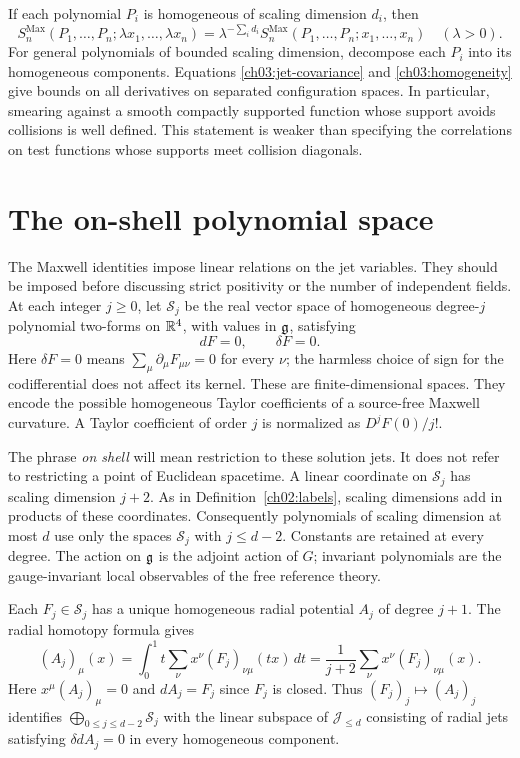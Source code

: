 If each polynomial $P_i$ is homogeneous of scaling dimension $d_i$, then
\begin{equation}\label{ch03:homogeneity}
 S_n^{\mathrm{Max}}(P_1,\ldots,P_n;\lambda x_1,\ldots,\lambda x_n)
 =\lambda^{-\sum_i d_i}
 S_n^{\mathrm{Max}}(P_1,\ldots,P_n;x_1,\ldots,x_n)
 \quad(\lambda>0).
\end{equation}
For general polynomials of bounded scaling dimension, decompose each $P_i$
into its homogeneous components. Equations \eqref{ch03:jet-covariance} and
\eqref{ch03:homogeneity} give bounds on all derivatives on separated
configuration spaces. In particular, smearing against a smooth compactly
supported function whose support avoids collisions is well defined.
This statement is weaker than specifying the correlations on test functions whose supports meet collision diagonals.

\section{The on-shell polynomial space}\label{ch03:shell}

The Maxwell identities impose linear relations on the jet variables.
They should be imposed before discussing strict positivity or the
number of independent fields. At each integer $j\ge0$, let
$\mathcal S_j$ be the real vector space of homogeneous degree-$j$
polynomial two-forms on $\mathbb R^4$, with values in $\mathfrak g$, satisfying
\[
 dF=0,\qquad \delta F=0.
\]
Here $\delta F=0$ means
$\sum_\mu\partial_\mu F_{\mu\nu}=0$ for every $\nu$; the harmless
choice of sign for the codifferential does not affect its kernel.
These are finite-dimensional spaces. They encode the possible homogeneous
Taylor coefficients of a source-free Maxwell curvature. A Taylor
coefficient of order $j$ is normalized as $D^jF(0)/j!$.

The phrase \emph{on shell} will mean restriction to these solution jets.
It does not refer to restricting a point of Euclidean spacetime.
A linear coordinate on $\mathcal S_j$ has scaling dimension $j+2$. As in Definition~\ref{ch02:labels},
scaling dimensions add in products of these coordinates.
Consequently polynomials of scaling dimension at most $d$ use only the spaces
$\mathcal S_j$ with $j\le d-2$. Constants are retained at every degree.
The action on $\mathfrak g$ is the adjoint action of $G$; invariant polynomials
are the gauge-invariant local observables of the free reference theory.

Each $F_j\in\mathcal S_j$ has a unique homogeneous radial potential
$A_j$ of degree $j+1$. The radial homotopy formula gives
\begin{equation}\label{ch03:radial}
 (A_j)_\mu(x)=\int_0^1 t\sum_\nu x^\nu(F_j)_{\nu\mu}(tx)\,dt
 =\frac{1}{j+2}\sum_\nu x^\nu(F_j)_{\nu\mu}(x).
\end{equation}
Here $x^\mu(A_j)_\mu=0$ and $dA_j=F_j$ since $F_j$ is closed.
Thus $(F_j)_j\mapsto(A_j)_j$ identifies
$\bigoplus_{0\le j\le d-2}\mathcal S_j$ with the linear subspace of
$\mathcal J_{\le d}$ consisting of radial jets satisfying
$\delta dA_j=0$ in every homogeneous component.

